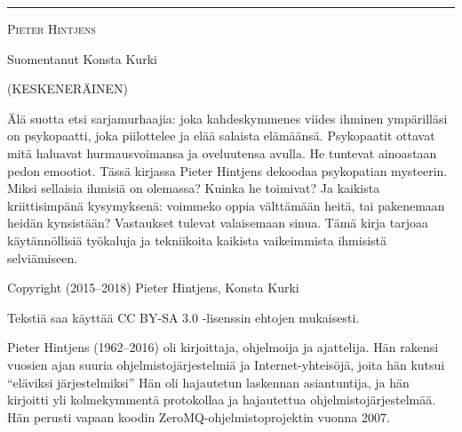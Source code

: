 \documentclass[11pt,oneside]{memoir}
\begin{document}
\frontmatter

\thispagestyle{empty}

\begin{center}


\noindent\rule{\textwidth}{0.8pt}

\vspace{0.12in}


\vtila

\textsc{Pieter Hintjens}

\vtila

\noindent Suomentanut Konsta Kurki

\vtila

\noindent {\today} (KESKENERÄINEN)

\end{center}

\vfill

\noindent Älä suotta etsi sarjamurhaajia: joka kahdeskymmenes viides ihminen ympärilläsi on psykopaatti, joka piilottelee ja elää salaista elämäänsä. Psykopaatit ottavat mitä haluavat hurmausvoimansa ja oveluutensa avulla. He tuntevat ainoastaan pedon emootiot. Tässä kirjassa Pieter Hintjens dekoodaa psykopatian mysteerin. Miksi sellaisia ihmisiä on olemassa? Kuinka he toimivat? Ja kaikista kriittisimpänä kysymyksenä: voimmeko oppia välttämään heitä, tai pakenemaan heidän kynsistään? Vastaukset tulevat valaisemaan sinua. Tämä kirja tarjoaa käytännöllisiä työkaluja ja tekniikoita kaikista vaikeimmista ihmisistä selviämiseen.

\vfill

\noindent Copyright {\textcopyright} (2015--2018) Pieter Hintjens, Konsta Kurki

\vtila

\noindent Tekstiä saa käyttää CC BY-SA 3.0 -lisenssin ehtojen mukaisesti.



\newpage

\thispagestyle{empty}

\noindent Pieter Hintjens (1962--2016) oli kirjoittaja, ohjelmoija ja ajattelija. Hän rakensi vuosien ajan suuria ohjelmistojärjestelmiä ja Internet-yhteisöjä, joita hän kutsui ``eläviksi järjestelmiksi'' Hän oli hajautetun laskennan asiantuntija, ja hän kirjoitti yli kolmekymmentä protokollaa ja hajautettua ohjelmistojärjestelmää. Hän perusti vapaan koodin ZeroMQ-ohjelmistoprojektin vuonna 2007.
\end{document}
